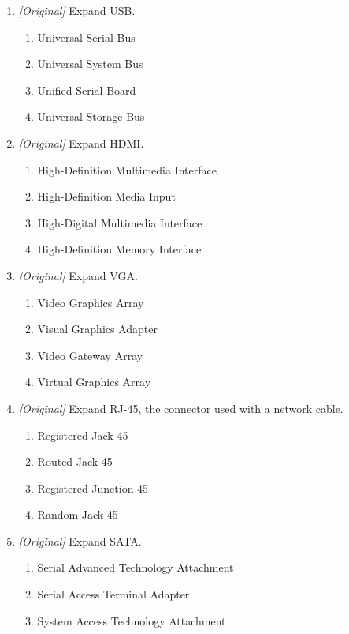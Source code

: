 \begin{enumerate}[label=\textbf{Q\arabic*.}, leftmargin=*]
\item \textit{[Original]} Expand USB.
  \begin{enumerate}[label=\Alph*.]
    \item Universal Serial Bus
    \item Universal System Bus
    \item Unified Serial Board
    \item Universal Storage Bus
  \end{enumerate}
\item \textit{[Original]} Expand HDMI.
  \begin{enumerate}[label=\Alph*.]
    \item High-Definition Multimedia Interface
    \item High-Definition Media Input
    \item High-Digital Multimedia Interface
    \item High-Definition Memory Interface
  \end{enumerate}
\item \textit{[Original]} Expand VGA.
  \begin{enumerate}[label=\Alph*.]
    \item Video Graphics Array
    \item Visual Graphics Adapter
    \item Video Gateway Array
    \item Virtual Graphics Array
  \end{enumerate}
\item \textit{[Original]} Expand RJ-45, the connector used with a network
  cable.
  \begin{enumerate}[label=\Alph*.]
    \item Registered Jack 45
    \item Routed Jack 45
    \item Registered Junction 45
    \item Random Jack 45
  \end{enumerate}
\item \textit{[Original]} Expand SATA.
  \begin{enumerate}[label=\Alph*.]
    \item Serial Advanced Technology Attachment
    \item Serial Access Terminal Adapter
    \item System Access Technology Attachment

\end{enumerate}
\end{enumerate}
